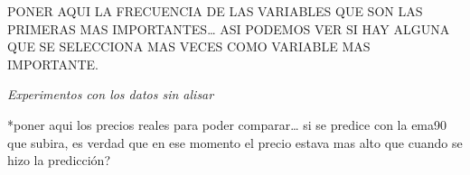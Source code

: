 \documentclass[]{article}
\begin{document}

\setlength\parskip{5ex}

PONER AQUI LA FRECUENCIA DE LAS VARIABLES QUE SON LAS PRIMERAS MAS
IMPORTANTES\ldots{} ASI PODEMOS VER SI HAY ALGUNA QUE SE SELECCIONA MAS
VECES COMO VARIABLE MAS IMPORTANTE.

\emph{Experimentos con los datos sin alisar}

*poner aqui los precios reales para poder comparar\ldots{} si se predice
con la ema90 que subira, es verdad que en ese momento el precio estava
mas alto que cuando se hizo la predicción?
\end{document}

